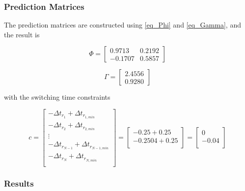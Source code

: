 \subsubsection{Prediction Matrices}

The prediction matrices are constructed using  \eqref{eq_Phi} and \eqref{eq_Gamma}, and the result is

\begin{equation}
    \Phi =
    \left[
    \begin{matrix}
        0.9713 & 0.2192 \\
        -0.1707 & 0.5857 
    \end{matrix}
    \right]
\end{equation}

\begin{equation}
    \Gamma =
    \left[
    \begin{matrix}
        2.4556 \\
        0.9280 
    \end{matrix}
    \right]
\end{equation}

with the switching time constraints

\begin{equation}
    c = 
    \left[
        \begin{matrix}
            -\Delta t_{r_1} + \Delta t_{r_{1, min}} \\
            -\Delta t_{r_2} + \Delta t_{r_{2, min}} \\
            \vdots \\
            -\Delta t_{r_{N-1}} + \Delta t_{r_{{N-1}, min}} \\
            -\Delta t_{r_N} + \Delta t_{r_{N, min}} \\
        \end{matrix}
    \right] = 
    \left[
        \begin{matrix}
            - 0.25 + 0.25 \\
            - 0.2504 + 0.25 \\
        \end{matrix}
    \right] =
    \left[
        \begin{matrix}
            0 \\
            - 0.04 \\
        \end{matrix}
    \right]
\end{equation}

\subsubsection{Results}

